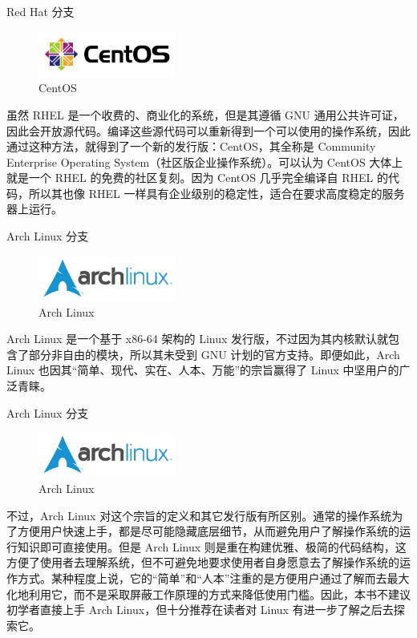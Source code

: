 \documentclass[UTF8]{ctexbeamer}
\begin{document}
\begin{frame}{Red Hat 分支}
    \begin{figure}
        \centering
        \includegraphics[width=0.4\textwidth]{centos.png}
        \caption{CentOS}
        \label{fig:centos}
    \end{figure}
    虽然 RHEL 是一个收费的、商业化的系统，但是其遵循 GNU 通用公共许可证，因此会开放源代码。编译这些源代码可以重新得到一个可以使用的操作系统，因此通过这种方法，就得到了一个新的发行版：CentOS，其全称是 Community Enterprise Operating System（社区版企业操作系统）。可以认为 CentOS 大体上就是一个 RHEL 的免费的社区复刻。因为 CentOS 几乎完全编译自 RHEL 的代码，所以其也像 RHEL 一样具有企业级别的稳定性，适合在要求高度稳定的服务器上运行。
\end{frame}
\begin{frame}{Arch Linux 分支}
    \begin{figure}
        \centering
        \includegraphics[width=0.4\textwidth]{archlinux.png}
        \caption{Arch Linux}
        \label{fig:archlinux}
    \end{figure}
    Arch Linux 是一个基于 x86-64 架构的 Linux 发行版，不过因为其内核默认就包含了部分非自由的模块，所以其未受到 GNU 计划的官方支持。即便如此，Arch Linux 也因其“简单、现代、实在、人本、万能”的宗旨赢得了 Linux 中坚用户的广泛青睐。
\end{frame}
\begin{frame}{Arch Linux 分支}
    \begin{figure}
        \centering
        \includegraphics[width=0.4\textwidth]{archlinux.png}
        \caption{Arch Linux}
    \end{figure}
    不过，Arch Linux 对这个宗旨的定义和其它发行版有所区别。通常的操作系统为了方便用户快速上手，都是尽可能隐藏底层细节，从而避免用户了解操作系统的运行知识即可直接使用。但是 Arch Linux 则是重在构建优雅、极简的代码结构，这方便了使用者去理解系统，但不可避免地要求使用者自身愿意去了解操作系统的运作方式。某种程度上说，它的“简单”和“人本”注重的是方便用户通过了解而去最大化地利用它，而不是采取屏蔽工作原理的方式来降低使用门槛。因此，本书不建议初学者直接上手 Arch Linux，但十分推荐在读者对 Linux 有进一步了解之后去探索它。
\end{frame}
\end{document}
